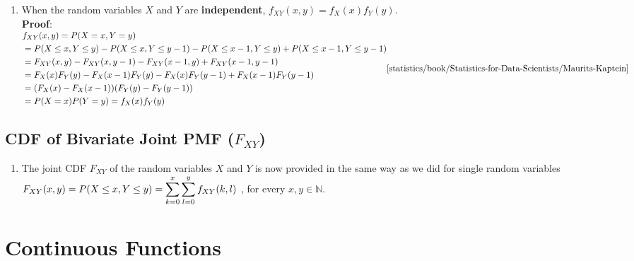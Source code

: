 \begin{enumerate}
    \item When the random variables $X$ and $Y$ are \textbf{independent}, $f _{X Y} (x, y) = f_X (x) f_Y (y)$.
    \hfill \cite{statistics/book/Statistics-for-Data-Scientists/Maurits-Kaptein}
    \\
    \textbf{Proof}:
    \\
    $
        \begin{aligned}
            &f _{X Y} (x, y)
            = P(X = x, Y = y) \\
            &= P(X \leq  x, Y \leq  y) - P(X \leq  x, Y \leq  y - 1) - P(X \leq  x - 1, Y \leq  y) + P(X \leq  x - 1, Y \leq  y - 1) \\
            &= F_{X Y} (x, y) - F_{X Y} (x, y - 1) - F_{X Y} (x - 1, y) + F_{X Y} (x - 1, y - 1) \\
            &= F_X (x)F_Y (y) - F_X (x - 1)F_Y (y) - F_X (x)F_Y (y - 1) + F_X (x - 1)F_Y (y - 1) \\
            &= (F_X (x) - F_X (x - 1))(F_Y (y) - F_Y (y - 1)) \\
            &= P(X = x) P(Y = y)
            = f_X (x) f_Y (y)
        \end{aligned}
        \hfill \text{\cite{statistics/book/Statistics-for-Data-Scientists/Maurits-Kaptein}}
    $
\end{enumerate}


\subsection{CDF of Bivariate Joint PMF ($F _{X Y}$)}

\begin{enumerate}
    \item The joint CDF $F _{X Y}$ of the random variables $X$ and $Y$ is now provided in the same way as we did for single random variables
    $
        F _{X Y} (x, y)
        = P(X \leq x, Y \leq y)
        = \displaystyle\sum^x _{k=0} \displaystyle\sum^y _{l=0} f _{X Y} (k, l)
    $
    , for every $x, y \in \mathbb{N}$.
    \hfill \cite{statistics/book/Statistics-for-Data-Scientists/Maurits-Kaptein}
\end{enumerate}









\section{Continuous Functions}


